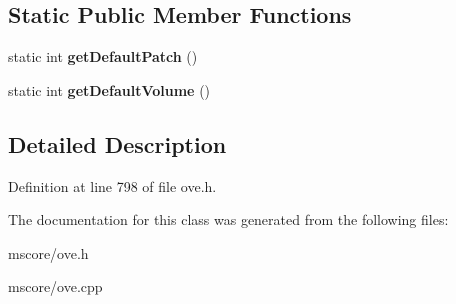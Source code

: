 \subsection*{Static Public Member Functions}
\begin{DoxyCompactItemize}
\item 
\mbox{\label{class_o_v_e_1_1_voice_aa872c1464ff16350385e56d765bb4ca9}} 
static int {\bfseries get\+Default\+Patch} ()
\item 
\mbox{\label{class_o_v_e_1_1_voice_a0c4493453a4a312b17dc02f097a3079b}} 
static int {\bfseries get\+Default\+Volume} ()
\end{DoxyCompactItemize}


\subsection{Detailed Description}


Definition at line 798 of file ove.\+h.



The documentation for this class was generated from the following files\+:\begin{DoxyCompactItemize}
\item 
mscore/ove.\+h\item 
mscore/ove.\+cpp\end{DoxyCompactItemize}
